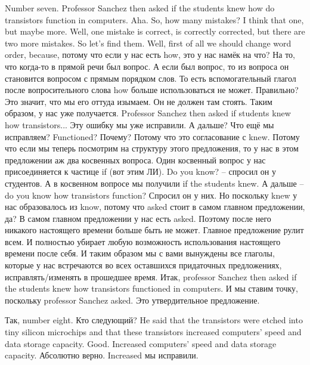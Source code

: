 \documentclass[main.tex]{subfiles}
\begin{document}
Number seven.
Professor Sanchez then asked if the students knew how do transistors function in computers.
Aha.
So, how many mistakes?
I think that one, but maybe more.
Well, one mistake is correct, is correctly corrected, but there are two more mistakes.
So let's find them.
Well, first of all we should change word order, because, потому что если у нас есть how, это у нас намёк на что?
На то, что когда-то в прямой речи был вопрос.
А если был вопрос, то из вопроса он становится вопросом с прямым порядком слов.
То есть вспомогательный глагол после вопросительного слова how больше использоваться не может.
Правильно?
Это значит, что мы его оттуда изымаем.
Он не должен там стоять.
Таким образом, у нас уже получается.
Professor Sanchez then asked if students knew how transistors...
Эту ошибку мы уже исправили.
А дальше?
Что ещё мы исправляем?
Functioned?
Почему?
Потому что это согласование с knew.
Потому что если мы теперь посмотрим на структуру этого предложения, то у нас в этом предложении аж два косвенных вопроса.
Один косвенный вопрос у нас присоединяется к частице if (вот этим ЛИ).
Do you know? -- спросил он у студентов.
А в косвенном вопросе мы получили if the students knew.
А дальше -- do you know how transistors function?
Спросил он у них.
Но поскольку knew у нас образовалось из know, потому что asked стоит в самом главном предложении, да?
В самом главном предложении у нас есть asked.
Поэтому после него никакого настоящего времени больше быть не может.
Главное предложение рулит всем.
И полностью убирает любую возможность использования настоящего времени после себя.
И таким образом мы с вами вынуждены все глаголы, которые у нас встречаются во всех оставшихся придаточных предложениях, исправлять/изменять в прошедшее время.
Итак, professor Sanchez then asked if the students knew how transistors functioned in computers.
И мы ставим точку, поскольку professor Sanchez asked.
Это утвердительное предложение.

Так, number eight.
Кто следующий?
He said that the transistors were etched into tiny silicon microchips and that these transistors increased computers' speed and data storage capacity.
Good.
Increased computers' speed and data storage capacity.
Абсолютно верно.
Increased мы исправили.
\end{document}
